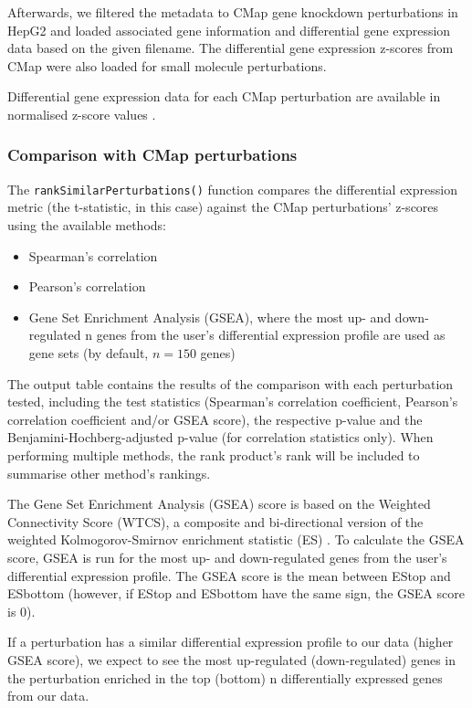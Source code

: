 Afterwards, we filtered the metadata to CMap gene knockdown perturbations in HepG2 and loaded associated gene information and differential gene expression data based on the given filename. The differential gene expression z-scores from CMap were also loaded for small molecule perturbations.

Differential gene expression data for each CMap perturbation are available in normalised z-score values \cite{subramanian:2017ul}.

\subsubsection{Comparison with CMap perturbations}

The \texttt{rankSimilarPerturbations()} function compares the differential expression metric (the t-statistic, in this case) against the CMap perturbations’ z-scores using the available methods:

\begin{itemize}
    \item Spearman’s correlation
    \item Pearson’s correlation
    \item Gene Set Enrichment Analysis (GSEA), where the most up- and down-regulated n genes from the user’s differential expression profile are used as gene sets (by default, $n = 150$ genes)
\end{itemize}

The output table contains the results of the comparison with each perturbation tested, including the test statistics (Spearman’s correlation coefficient, Pearson’s correlation coefficient and/or GSEA score), the respective p-value and the Benjamini-Hochberg-adjusted p-value (for correlation statistics only). When performing multiple methods, the rank product’s rank will be included to summarise other method’s rankings.

The Gene Set Enrichment Analysis (GSEA) score is based on the Weighted Connectivity Score (WTCS), a composite and bi-directional version of the weighted Kolmogorov-Smirnov enrichment statistic (ES) \cite{subramanian:2017ul}. To calculate the GSEA score, GSEA is run for the most up- and down-regulated genes from the user’s differential expression profile. The GSEA score is the mean between EStop and ESbottom (however, if EStop and ESbottom have the same sign, the GSEA score is 0).

If a perturbation has a similar differential expression profile to our data (higher GSEA score), we expect to see the most up-regulated (down-regulated) genes in the perturbation enriched in the top (bottom) n differentially expressed genes from our data.

